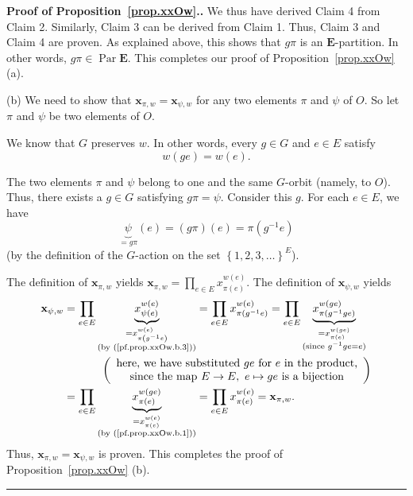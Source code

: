 \documentclass[numbers=enddot,12pt,final,onecolumn,notitlepage,abstracton]{scrartcl}
\theoremstyle{definition}
\newenvironment{proof}[1][Proof]{\noindent\textbf{#1.} }{\ \rule{0.5em}{0.5em}}
\let\prodnonlimits\prod
\renewcommand{\prod}{\prodnonlimits\limits}
\newenvironment{verlong}{}{}
\newcommand{\xx}{{\mathbf{x}}}
\newcommand{\Par}{\operatorname{Par}}
\newcommand{\EE}{{\mathbf{E}}}
\begin{document}
\begin{verlong}
\begin{proof}[Proof of Proposition~\ref{prop.xxOw}.]
We thus have derived Claim 4 from Claim 2. Similarly, Claim 3 can be
derived from Claim 1. Thus, Claim 3 and Claim 4 are proven. As
explained above, this shows that $g \pi$ is an $\EE$-partition. In
other words, $g \pi \in \Par \EE$. This completes our proof of
Proposition~\ref{prop.xxOw} (a).

(b) We need to show that $\xx_{\pi, w} = \xx_{\psi, w}$ for any two
elements $\pi$ and $\psi$ of $O$. So let $\pi$ and $\psi$ be two
elements of $O$.

We know that $G$ preserves $w$. In other words, every $g \in G$ and
$e \in E$ satisfy
\begin{equation}
w \left( ge \right) = w \left( e \right) .
\label{pf.prop.xxOw.b.1}
\end{equation}

The two elements $\pi$ and $\psi$ belong to one and
the same $G$-orbit (namely, to $O$). Thus, there exists a $g \in G$
satisfying $g \pi = \psi$. Consider this $g$. For each $e \in E$,
we have
\begin{equation}
\underbrace{\psi}_{= g \pi} \left(e\right)
= \left(g \pi\right) \left(e\right)
= \pi \left(g^{-1} e\right)
\label{pf.prop.xxOw.b.3}
\end{equation}
(by the definition of the $G$-action on the set
$\left\{1, 2, 3, \ldots\right\}^E$).

The definition of $\xx_{\pi, w}$ yields
$\xx_{\pi, w}
= \prod_{e \in E} x_{\pi\left(e\right)}^{w\left(e\right)}$.
The definition of $\xx_{\psi, w}$ yields
\begin{align*}
\xx_{\psi, w}
&= \prod_{e \in E} \underbrace{x_{\psi\left(e\right)}^{w\left(e\right)}}_{\substack{= x_{\pi \left(g^{-1} e\right)}^{w\left(e\right)} \\ \text{(by (\ref{pf.prop.xxOw.b.3}))}}}
= \prod_{e \in E} x_{\pi \left(g^{-1} e\right)}^{w\left(e\right)}
= \prod_{e \in E}
     \underbrace{x_{\pi \left(g^{-1} g e\right)}^{w\left(g e\right)}}_{
                \substack{= x_{\pi\left(e\right)}^{w\left(g e\right)} \\
                           \text{(since } g^{-1} g e = e \text{)}}} \\
& \ \ \ \ \ \ \ \ \ \ \left( \begin{array}{c}
\text{here, we have substituted } g e \text{ for } e \text{ in the product,} \\
\text{since the map } E \to E, \ e \mapsto g e \text{ is a bijection}
\end{array} \right) \\
&= \prod_{e \in E} \underbrace{x_{\pi\left(e\right)}^{w\left(g e\right)}}_{\substack{= x_{\pi\left(e\right)}^{w\left(e\right)} \\ \text{(by (\ref{pf.prop.xxOw.b.1}))}}}
= \prod_{e \in E} x_{\pi\left(e\right)}^{w\left(e\right)}
= \xx_{\pi, w} .
\end{align*}
Thus, $\xx_{\pi, w} = \xx_{\psi, w}$ is proven. This completes the
proof of Proposition~\ref{prop.xxOw} (b).
\end{proof}
\end{verlong}
\end{document}
